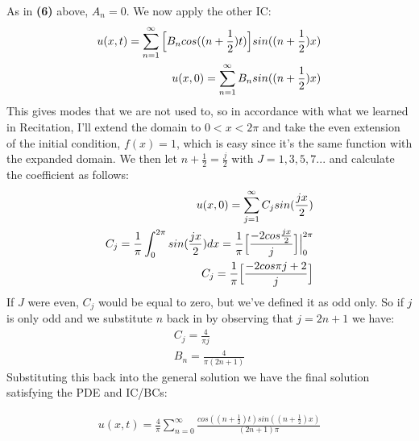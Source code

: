 \documentclass{article}
\begin{document}
As in \textbf{(6)} above, $A_n = 0$. We now apply the other IC:
\begin{equation}
\begin{aligned}
u(x,t) = \sum^{\infty}_{n=1}\Big{[}B_ncos((n+\frac{1}{2})t)\Big{]}sin((n+\frac{1}{2})x)\\
u(x,0) = \sum_{n=1}^{\infty}B_nsin((n+\frac{1}{2})x)
\end{aligned}
\end{equation}
This gives modes that we are not used to, so in accordance with what we learned in Recitation, I'll extend the domain to $0 < x < 2\pi$ and take the even extension of the initial condition, $f(x) = 1$, which is easy since it's the same function with the expanded domain. We then let $n+\frac{1}{2} = \frac{j}{2}$ with $J = 1, 3, 5, 7...$ and calculate the coefficient as follows:
\begin{equation}
\begin{aligned}
u(x,0) = \sum_{j=1}^{\infty}C_jsin(\frac{jx}{2})\\
C_j = \frac{1}{\pi}\int_0^{2\pi}sin(\frac{jx}{2})dx = \frac{1}{\pi}\Big{[}\frac{-2cos{\frac{jx}{2}}}{j}\Big{]}\Big{|}_0^{2\pi}\\
C_j = \frac{1}{\pi}\Big{[}\frac{-2cos{\pi j}+2}{j}\Big{]}	
\end{aligned}
\end{equation}
If $J$ were even, $C_j$ would be equal to zero, but we've defined it as odd only. So if $j$ is only odd and we substitute $n$ back in by observing that $j = 2n+1$ we have:
\begin{equation}
\begin{aligned}
C_j = \frac{4}{\pi j}\\
B_n = \frac{4}{\pi(2n+1)}
\end{aligned}
\end{equation}
Substituting this back into the general solution we have the final solution satisfying the PDE and IC/BCs:
\begin{tcolorbox}[minipage,colback=white,arc=0pt,outer arc=0pt]
\begin{equation}
\begin{aligned}
u(x,t) = \frac{4}{\pi}\sum^{\infty}_{n=0}\frac{cos((n+\frac{1}{2})t)sin((n+\frac{1}{2})x)}{(2n+1)\pi}
\end{aligned}
\end{equation}
\end{tcolorbox}
\end{document}
